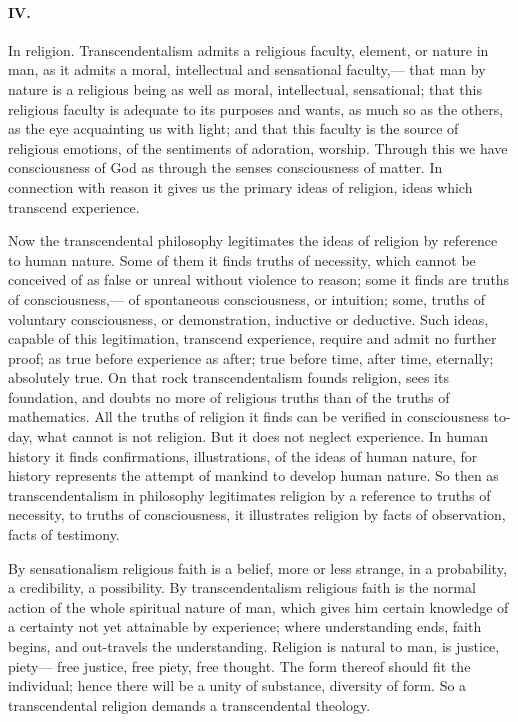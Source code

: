 \documentclass[12pt]{article}
\begin{document}
\paragraph{IV.} In religion. Transcendentalism admits a religious faculty, element, or nature in man, as it admits a moral, intellectual and sensational faculty,--- that man by nature is a religious being as well as moral, intellectual, sensational; that this religious faculty is adequate to its purposes and wants, as much so as the others, as the eye acquainting us with light; and that this faculty is the source of religious emotions, of the sentiments of adoration, worship. Through this we have consciousness of God as through the senses consciousness of matter. In connection with reason it gives us the primary ideas of religion, ideas which transcend experience. 

Now the transcendental philosophy legitimates the ideas of religion by reference to human nature. Some of them it finds truths of necessity, which cannot be conceived of as false or unreal without violence to reason; some it finds are truths of consciousness,--- of spontaneous consciousness, or intuition; some, truths of voluntary consciousness, or demonstration, inductive or deductive. Such ideas, capable of this legitimation, transcend experience, require and admit no further proof; as true before experience as after; true before time, after time, eternally; absolutely true. On that rock transcendentalism founds religion, sees its foundation, and doubts no more of religious truths than of the truths of mathematics. All the truths of religion it finds can be verified in consciousness to-day, what cannot is not religion. But it does not neglect experience. In human history it finds confirmations, illustrations, of the ideas of human nature, for history represents the attempt of mankind to develop human nature. So then as transcendentalism in philosophy legitimates religion by a reference to truths of necessity, to truths of consciousness, it illustrates religion by facts of observation, facts of testimony. 

By sensationalism religious faith is a belief, more or less strange, in a probability, a credibility, a possibility. By transcendentalism religious faith is the normal action of the whole spiritual nature of man, which gives him certain knowledge of a certainty not yet attainable by experience; where understanding ends, faith begins, and out-travels the understanding. Religion is natural to man, is justice, piety--- free justice, free piety, free thought. The form thereof should fit the individual; hence there will be a unity of substance, diversity of form. So a transcendental religion demands a transcendental theology. 
\end{document}
